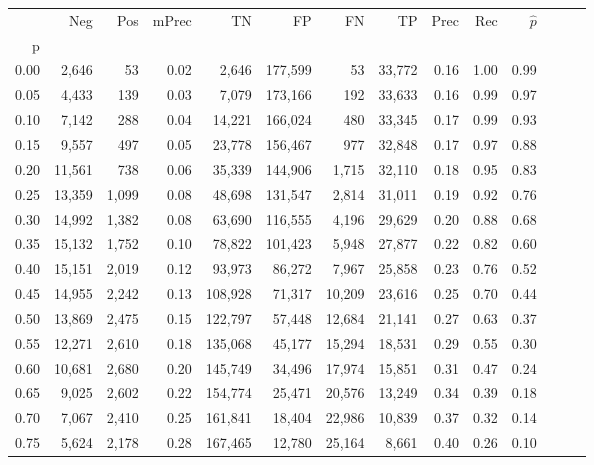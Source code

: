 \begin{tabular}{rrrrrrrrrrrrrr}
\toprule
{} &     Neg &    Pos & mPrec &       TN &       FP &      FN &      TP &  Prec &   Rec & $\hat{p}$ \\
p    &         &        &       &          &          &         &         &       &       &           \\
\midrule
0.00 &   2,646 &     53 &  0.02 &    2,646 &  177,599 &      53 &  33,772 &  0.16 &  1.00 &      0.99 \\
0.05 &   4,433 &    139 &  0.03 &    7,079 &  173,166 &     192 &  33,633 &  0.16 &  0.99 &      0.97 \\
0.10 &   7,142 &    288 &  0.04 &   14,221 &  166,024 &     480 &  33,345 &  0.17 &  0.99 &      0.93 \\
0.15 &   9,557 &    497 &  0.05 &   23,778 &  156,467 &     977 &  32,848 &  0.17 &  0.97 &      0.88 \\
0.20 &  11,561 &    738 &  0.06 &   35,339 &  144,906 &   1,715 &  32,110 &  0.18 &  0.95 &      0.83 \\
0.25 &  13,359 &  1,099 &  0.08 &   48,698 &  131,547 &   2,814 &  31,011 &  0.19 &  0.92 &      0.76 \\
0.30 &  14,992 &  1,382 &  0.08 &   63,690 &  116,555 &   4,196 &  29,629 &  0.20 &  0.88 &      0.68 \\
0.35 &  15,132 &  1,752 &  0.10 &   78,822 &  101,423 &   5,948 &  27,877 &  0.22 &  0.82 &      0.60 \\
0.40 &  15,151 &  2,019 &  0.12 &   93,973 &   86,272 &   7,967 &  25,858 &  0.23 &  0.76 &      0.52 \\
0.45 &  14,955 &  2,242 &  0.13 &  108,928 &   71,317 &  10,209 &  23,616 &  0.25 &  0.70 &      0.44 \\
0.50 &  13,869 &  2,475 &  0.15 &  122,797 &   57,448 &  12,684 &  21,141 &  0.27 &  0.63 &      0.37 \\
0.55 &  12,271 &  2,610 &  0.18 &  135,068 &   45,177 &  15,294 &  18,531 &  0.29 &  0.55 &      0.30 \\
0.60 &  10,681 &  2,680 &  0.20 &  145,749 &   34,496 &  17,974 &  15,851 &  0.31 &  0.47 &      0.24 \\
0.65 &   9,025 &  2,602 &  0.22 &  154,774 &   25,471 &  20,576 &  13,249 &  0.34 &  0.39 &      0.18 \\
0.70 &   7,067 &  2,410 &  0.25 &  161,841 &   18,404 &  22,986 &  10,839 &  0.37 &  0.32 &      0.14 \\
0.75 &   5,624 &  2,178 &  0.28 &  167,465 &   12,780 &  25,164 &   8,661 &  0.40 &  0.26 &      0.10 \\

\end{tabular}

